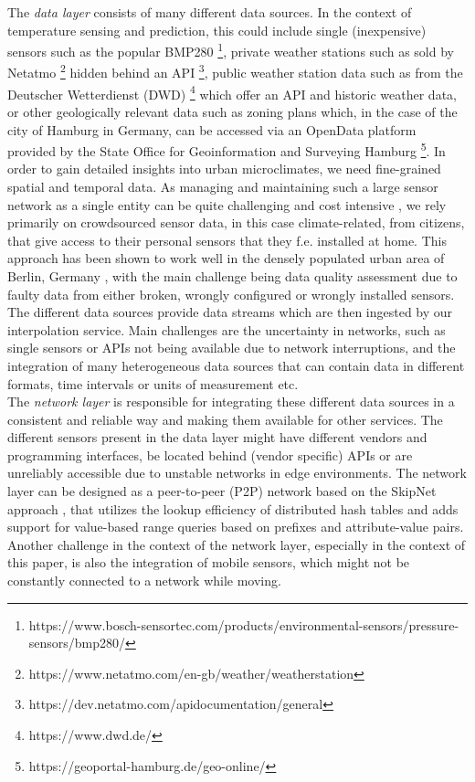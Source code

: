 The \textit{data layer} consists of many different data sources. In the context of temperature sensing and prediction, this could include single (inexpensive) sensors such as the popular BMP280 \footnote{https://www.bosch-sensortec.com/products/environmental-sensors/pressure-sensors/bmp280/}, private weather stations such as sold by Netatmo \footnote{https://www.netatmo.com/en-gb/weather/weatherstation} hidden behind an API \footnote{https://dev.netatmo.com/apidocumentation/general}, public weather station data such as from the Deutscher Wetterdienst (DWD) \footnote{https://www.dwd.de/} which offer an API and historic weather data, or other geologically relevant data such as zoning plans which, in the case of the city of Hamburg in Germany, can be accessed via an OpenData platform provided by the State Office for Geoinformation and Surveying Hamburg \footnote{https://geoportal-hamburg.de/geo-online/}. In order to gain detailed insights into urban microclimates, we need fine-grained spatial and temporal data. As managing and maintaining such a large sensor network as a single entity can be quite challenging and cost intensive \cite{chapman2015birmingham}, we rely primarily on crowdsourced sensor data, in this case climate-related, from citizens, that give access to their personal sensors that they f.e. installed at home. This approach has been shown to work well in the densely populated urban area of Berlin, Germany \cite{meier2017crowdsourcing}, with the main challenge being data quality assessment due to faulty data from either broken, wrongly configured or wrongly installed sensors. The different data sources provide data streams which are then ingested by our interpolation service. Main challenges are the uncertainty in networks, such as single sensors or APIs not being available due to network interruptions, and the integration of many heterogeneous data sources that can contain data in different formats, time intervals or units of measurement etc.\\
The \textit{network layer} is responsible for integrating these different data sources in a consistent and reliable way and making them available for other services. The different sensors present in the data layer might have different vendors and programming interfaces, be located behind (vendor specific) APIs or are unreliably accessible due to unstable networks in edge environments. The network layer can be designed as a peer-to-peer (P2P) network based on the SkipNet approach \cite{harvey2002skipnet}, that utilizes the lookup efficiency of distributed hash tables and adds support for value-based range queries based on prefixes and attribute-value pairs. Another challenge in the context of the network layer, especially in the context of this paper, is also the integration of mobile sensors, which might not be constantly connected to a network while moving.\\
